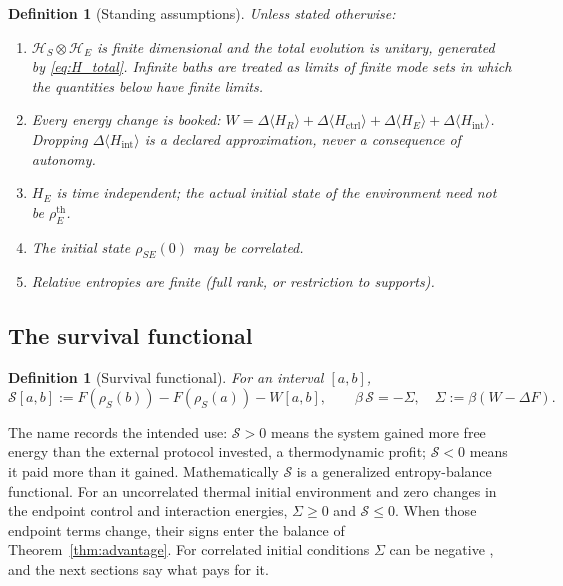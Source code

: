 \documentclass[12pt]{article}
\newtheorem{definition}[theorem]{Definition}
\begin{document}
\begin{definition}[Standing assumptions]
\label{def:assumptions}
Unless stated otherwise:
\begin{enumerate}
\item[\textup{(A1)}] $\mathcal H_S\otimes\mathcal H_E$ is finite dimensional and the total evolution is unitary, generated by \eqref{eq:H_total}. Infinite baths are treated as limits of finite mode sets in which the quantities below have finite limits.
\item[\textup{(A2)}] Every energy change is booked: $W=\Delta\langle H_R\rangle+\Delta\langle H_{\mathrm{ctrl}}\rangle+\Delta\langle H_E\rangle+\Delta\langle H_{\mathrm{int}}\rangle$. Dropping $\Delta\langle H_{\mathrm{int}}\rangle$ is a declared approximation, never a consequence of autonomy.
\item[\textup{(A3)}] $H_E$ is time independent; the actual initial state of the environment need not be $\rho_E^{\mathrm{th}}$.
\item[\textup{(A4)}] The initial state $\rho_{SE}(0)$ may be correlated.
\item[\textup{(A5)}] Relative entropies are finite (full rank, or restriction to supports).
\end{enumerate}
\end{definition}

\subsection{The survival functional}
\label{subsec:survival}

\begin{definition}[Survival functional]
\label{def:survival}
For an interval $[a,b]$,
\begin{equation}
\label{eq:survival}
\mathcal S[a,b]:=F(\rho_S(b))-F(\rho_S(a))-W[a,b],\qquad
\beta\,\mathcal S=-\Sigma,\quad \Sigma:=\beta(W-\Delta F).
\end{equation}
\end{definition}

The name records the intended use: $\mathcal S>0$ means the system gained more free energy than the external protocol invested, a thermodynamic profit; $\mathcal S<0$ means it paid more than it gained. Mathematically $\mathcal S$ is a generalized entropy-balance functional. For an uncorrelated thermal initial environment and zero changes in the endpoint control and interaction energies, $\Sigma\ge0$ and $\mathcal S\le0$. When those endpoint terms change, their signs enter the balance of Theorem~\ref{thm:advantage}. For correlated initial conditions $\Sigma$ can be negative \cite{EspositoLindenbergVandenBroeck2010}, and the next sections say what pays for it.
\end{document}
